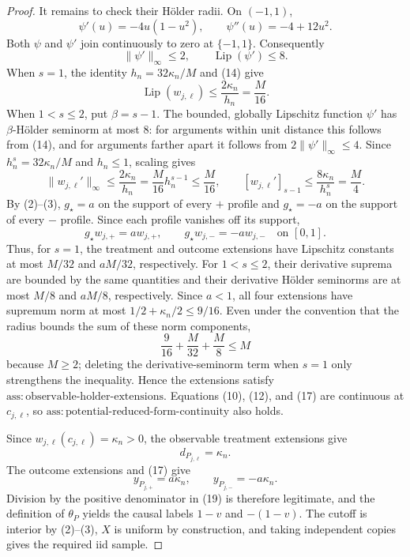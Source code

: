 \documentclass{article}
\begin{document}
\begin{proof}
It remains to check their H\"older radii.  On \((-1,1)\),
\[
\psi'(u)=-4u(1-u^2),
\qquad
\psi''(u)=-4+12u^2.
\tag{13}
\]
Both \(\psi\) and \(\psi'\) join continuously to zero at \(\{-1,1\}\).  Consequently
\[
\lVert\psi'\rVert_\infty\le2,
\qquad
\operatorname{Lip}(\psi')\le8.
\tag{14}
\]
When \(s=1\), the identity \(h_n=32\kappa_n/M\) and (14) give
\[
\operatorname{Lip}(w_{j,\ell})
\le\frac{2\kappa_n}{h_n}=\frac{M}{16}.
\tag{15}
\]
When \(1<s\le2\), put \(\beta=s-1\).  The bounded, globally Lipschitz function \(\psi'\) has \(\beta\)-H\"older seminorm at most \(8\): for arguments within unit distance this follows from (14), and for arguments farther apart it follows from \(2\lVert\psi'\rVert_\infty\le4\).  Since \(h_n^s=32\kappa_n/M\) and \(h_n\le1\), scaling gives
\[
\lVert w_{j,\ell}'\rVert_\infty
\le\frac{2\kappa_n}{h_n}
=\frac{M}{16}h_n^{s-1}\le\frac{M}{16},
\qquad
[w_{j,\ell}']_{s-1}
\le\frac{8\kappa_n}{h_n^s}=\frac{M}{4}.
\tag{16}
\]
By (2)--(3), \(g_\star=a\) on the support of every \(+\) profile and \(g_\star=-a\) on the support of every \(-\) profile.  Since each profile vanishes off its support,
\[
g_\star w_{j,+}=a w_{j,+},
\qquad
g_\star w_{j,-}=-a w_{j,-}
\quad\text{on }[0,1].
\tag{17}
\]
Thus, for \(s=1\), the treatment and outcome extensions have Lipschitz constants at most \(M/32\) and \(aM/32\), respectively.  For \(1<s\le2\), their derivative suprema are bounded by the same quantities and their derivative H\"older seminorms are at most \(M/8\) and \(aM/8\), respectively.  Since \(a<1\), all four extensions have supremum norm at most \(1/2+\kappa_n/2\le9/16\).  Even under the convention that the radius bounds the sum of these norm components,
\[
\frac9{16}+\frac{M}{32}+\frac{M}{8}\le M
\tag{18}
\]
because \(M\ge2\); deleting the derivative-seminorm term when \(s=1\) only strengthens the inequality.  Hence the extensions satisfy \(\mathrm{ass:observable\mbox{-}holder\mbox{-}extensions}\).  Equations (10), (12), and (17) are continuous at \(c_{j,\ell}\), so \(\mathrm{ass:potential\mbox{-}reduced\mbox{-}form\mbox{-}continuity}\) also holds.

Since \(w_{j,\ell}(c_{j,\ell})=\kappa_n>0\), the observable treatment extensions give
\[
d_{P_{j,\ell}}=\kappa_n.
\tag{19}
\]
The outcome extensions and (17) give
\[
y_{P_{j,+}}=a\kappa_n,
\qquad
y_{P_{j,-}}=-a\kappa_n.
\tag{20}
\]
Division by the positive denominator in (19) is therefore legitimate, and the definition of \(\theta_P\) yields the causal labels \(1-v\) and \(-(1-v)\).  The cutoff is interior by (2)--(3), \(X\) is uniform by construction, and taking independent copies gives the required iid sample.


\end{proof}
\end{document}
